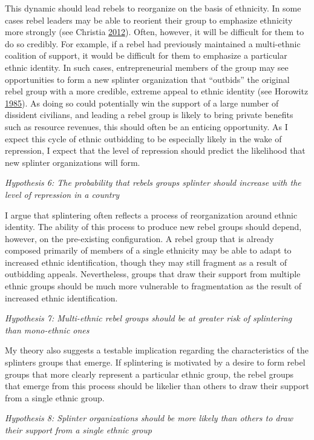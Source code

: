 \documentclass[12pt,]{book}
\theoremstyle{definition}
\theoremstyle{definition}
\theoremstyle{definition}
\theoremstyle{remark}
\begin{document}
This dynamic should lead rebels to reorganize on the basis of ethnicity.
In some cases rebel leaders may be able to reorient their group to
emphasize ethnicity more strongly (see Christia
\protect\hyperlink{ref-Christia2012}{2012}). Often, however, it will be
difficult for them to do so credibly. For example, if a rebel had
previously maintained a multi-ethnic coalition of support, it would be
difficult for them to emphasize a particular ethnic identity. In such
cases, entrepreneurial members of the group may see opportunities to
form a new splinter organization that ``outbids'' the original rebel
group with a more credible, extreme appeal to ethnic identity (see
Horowitz \protect\hyperlink{ref-horowitz85}{1985}). As doing so could
potentially win the support of a large number of dissident civilians,
and leading a rebel group is likely to bring private benefits such as
resource revenues, this should often be an enticing opportunity. As I
expect this cycle of ethnic outbidding to be especially likely in the
wake of repression, I expect that the level of repression should predict
the likelihood that new splinter organizations will form.

\emph{Hypothesis 6: The probability that rebels groups splinter should
increase with the level of repression in a country}

I argue that splintering often reflects a process of reorganization
around ethnic identity. The ability of this process to produce new rebel
groups should depend, however, on the pre-existing configuration. A
rebel group that is already composed primarily of members of a single
ethnicity may be able to adapt to increased ethnic identification,
though they may still fragment as a result of outbidding appeals.
Nevertheless, groups that draw their support from multiple ethnic groups
should be much more vulnerable to fragmentation as the result of
increased ethnic identification.

\emph{Hypothesis 7: Multi-ethnic rebel groups should be at greater risk
of splintering than mono-ethnic ones}

My theory also suggests a testable implication regarding the
characteristics of the splinters groups that emerge. If splintering is
motivated by a desire to form rebel groups that more clearly represent a
particular ethnic group, the rebel groups that emerge from this process
should be likelier than others to draw their support from a single
ethnic group.

\emph{Hypothesis 8: Splinter organizations should be more likely than
others to draw their support from a single ethnic group}
\end{document}
